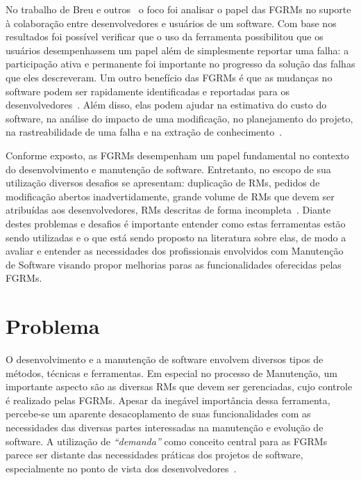 No trabalho de Breu e outros~\cite{breu2010information} o foco foi
analisar o papel das FGRMs no suporte à colaboração entre desenvolvedores e
usuários de um software. Com base nos resultados foi possível verificar que o
uso da ferramenta possibilitou que os usuários desempenhassem um papel além de
simplesmente reportar uma falha: a participação ativa e permanente foi
importante no progresso da solução das falhas que eles descreveram. Um outro
benefício das FGRMs é que as mudanças no software podem ser rapidamente
identificadas e reportadas para os desenvolvedores~\cite{anvik2005coping}. Além
disso, elas podem ajudar na estimativa do custo do software, na análise do
impacto de uma modificação, no planejamento do projeto, na rastreabilidade de
uma falha e na extração de conhecimento~\cite{cavalcanti2013bug}.

Conforme exposto, as FGRMs desempenham um papel fundamental no contexto do
desenvolvimento e manutenção de software. Entretanto, no escopo de sua
utilização diversos desafios se apresentam: duplicação de RMs, pedidos de
modificação abertos inadvertidamente, grande volume de RMs que devem ser
atribuídas aos desenvolvedores, RMs descritas de forma
incompleta~\cite{cavalcanti2014challenges}. Diante destes problemas e desafios
é importante entender como estas ferramentas estão sendo utilizadas e o que
está sendo proposto na literatura sobre elas, de modo a avaliar e entender as
necessidades dos profissionais envolvidos com Manutenção de Software visando
propor melhorias paras as funcionalidades oferecidas pelas FGRMs.

\section{Problema}
\label{sec:intro-problema}

O desenvolvimento e a manutenção de software envolvem diversos tipos de métodos,
técnicas e ferramentas. Em especial no processo de Manutenção, um importante
aspecto são as diversas RMs que devem ser gerenciadas, cujo controle é realizado
pelas FGRMs. Apesar da inegável importância dessa ferramenta, percebe-se um
aparente desacoplamento de suas funcionalidades com as necessidades das diversas
partes interessadas na manutenção e evolução de software. A utilização de
\textit{``demanda''} como conceito central para as FGRMs parece ser distante das
necessidades práticas dos projetos de software, especialmente no ponto de vista
dos desenvolvedores~\cite{Baysal:2013:SAP:2486788.2486957}.

